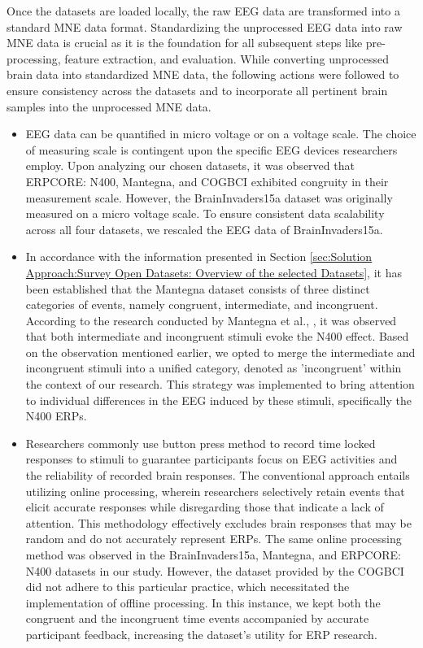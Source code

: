 Once the datasets are loaded locally, the raw EEG data are transformed into a standard MNE data format. Standardizing the unprocessed EEG data into raw MNE data is crucial as it is the foundation for all subsequent steps like pre-processing, feature extraction, and evaluation. While converting unprocessed brain data into standardized MNE data, the following actions were followed to ensure consistency across the datasets and to incorporate all pertinent brain samples into the unprocessed MNE data.  
\begin{itemize}
\item EEG data can be quantified in micro voltage or on a voltage scale. The choice of measuring scale is contingent upon the specific EEG devices researchers employ. Upon analyzing our chosen datasets, it was observed that ERPCORE: N400, Mantegna, and COGBCI exhibited congruity in their measurement scale. However, the BrainInvaders15a dataset was originally measured on a micro voltage scale. To ensure consistent data scalability across all four datasets, we rescaled the EEG data of BrainInvaders15a.
    
\item In accordance with the information presented in Section \ref{sec:Solution Approach:Survey Open Datasets: Overview of the selected Datasets}, it has been established that the Mantegna dataset consists of three distinct categories of events, namely congruent, intermediate, and incongruent. According to the research conducted by Mantegna et al., \cite{mantegna2019distinguishing}, it was observed that both intermediate and incongruent stimuli evoke the N400 effect. Based on the observation mentioned earlier, we opted to merge the intermediate and incongruent stimuli into a unified category, denoted as 'incongruent' within the context of our research. This strategy was implemented to bring attention to individual differences in the EEG induced by these stimuli, specifically the N400 ERPs.  

\item Researchers commonly use button press method to record time locked responses to stimuli to guarantee participants focus on EEG activities and the reliability of recorded brain responses. The conventional approach entails utilizing online processing, wherein researchers selectively retain events that elicit accurate responses while disregarding those that indicate a lack of attention. This methodology effectively excludes brain responses that may be random and do not accurately represent ERPs. The same online processing method was observed in the BrainInvaders15a, Mantegna, and ERPCORE: N400 datasets in our study. However, the dataset provided by the COGBCI did not adhere to this particular practice, which necessitated the implementation of offline processing. In this instance, we kept both the congruent and the incongruent time events accompanied by accurate participant feedback, increasing the dataset's utility for ERP research.


\end{itemize}
